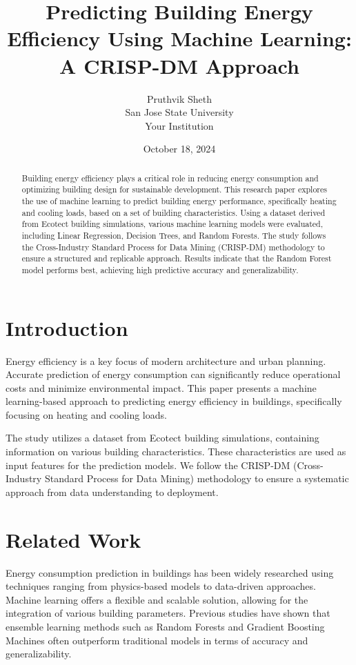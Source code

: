 \documentclass[12pt]{article}
\title{Predicting Building Energy Efficiency Using Machine Learning: A CRISP-DM Approach}
\author{Pruthvik Sheth \\
San Jose State University\\
Your Institution}
\date{October 18, 2024}
\begin{document}
\maketitle

\begin{abstract}
Building energy efficiency plays a critical role in reducing energy consumption and optimizing building design for sustainable development. This research paper explores the use of machine learning to predict building energy performance, specifically heating and cooling loads, based on a set of building characteristics. Using a dataset derived from Ecotect building simulations, various machine learning models were evaluated, including Linear Regression, Decision Trees, and Random Forests. The study follows the Cross-Industry Standard Process for Data Mining (CRISP-DM) methodology to ensure a structured and replicable approach. Results indicate that the Random Forest model performs best, achieving high predictive accuracy and generalizability.
\end{abstract}

\section{Introduction}
Energy efficiency is a key focus of modern architecture and urban planning. Accurate prediction of energy consumption can significantly reduce operational costs and minimize environmental impact. This paper presents a machine learning-based approach to predicting energy efficiency in buildings, specifically focusing on heating and cooling loads.

The study utilizes a dataset from Ecotect building simulations, containing information on various building characteristics. These characteristics are used as input features for the prediction models. We follow the CRISP-DM (Cross-Industry Standard Process for Data Mining) methodology to ensure a systematic approach from data understanding to deployment.

\section{Related Work}
Energy consumption prediction in buildings has been widely researched using techniques ranging from physics-based models to data-driven approaches. Machine learning offers a flexible and scalable solution, allowing for the integration of various building parameters. Previous studies have shown that ensemble learning methods such as Random Forests and Gradient Boosting Machines often outperform traditional models in terms of accuracy and generalizability.
\end{document}
